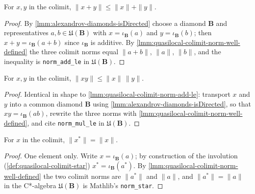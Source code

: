 \begin{lemma}
    \label{lmm:quasilocal-colimit-norm-add-le}
    For $x, y$ in the colimit, $\|x + y\| \le \|x\| + \|y\|$.
\end{lemma}
\begin{proof}
    By \ref{lmm:alexandrov-diamonds-isDirected} choose a diamond $\mathbf{B}$ and representatives $a, b \in \mathfrak{U}(\mathbf{B})$ with $x = \iota_{\mathbf{B}}(a)$ and $y = \iota_{\mathbf{B}}(b)$; then $x + y = \iota_{\mathbf{B}}(a + b)$ since $\iota_{\mathbf{B}}$ is additive. By \ref{lmm:quasilocal-colimit-norm-well-defined} the three colimit norms equal $\|a+b\|$, $\|a\|$, $\|b\|$, and the inequality is \texttt{norm\_add\_le} in $\mathfrak{U}(\mathbf{B})$.
\end{proof}

\begin{lemma}
    \label{lmm:quasilocal-colimit-norm-mul-le}
    For $x, y$ in the colimit, $\|xy\| \le \|x\|\,\|y\|$.
\end{lemma}
\begin{proof}
    Identical in shape to \ref{lmm:quasilocal-colimit-norm-add-le}: transport $x$ and $y$ into a common diamond $\mathbf{B}$ using \ref{lmm:alexandrov-diamonds-isDirected}, so that $xy = \iota_{\mathbf{B}}(ab)$, rewrite the three norms with \ref{lmm:quasilocal-colimit-norm-well-defined}, and cite \texttt{norm\_mul\_le} in $\mathfrak{U}(\mathbf{B})$.
\end{proof}

\begin{lemma}
    \label{lmm:quasilocal-colimit-norm-star}
    For $x$ in the colimit, $\|x^{*}\| = \|x\|$.
\end{lemma}
\begin{proof}
    One element only. Write $x = \iota_{\mathbf{B}}(a)$; by construction of the involution (\ref{def:quasilocal-colimit-star}) $x^{*} = \iota_{\mathbf{B}}(a^{*})$. By \ref{lmm:quasilocal-colimit-norm-well-defined} the two colimit norms are $\|a^{*}\|$ and $\|a\|$, and $\|a^{*}\| = \|a\|$ in the C*-algebra $\mathfrak{U}(\mathbf{B})$ is Mathlib's \texttt{norm\_star}.
\end{proof}

